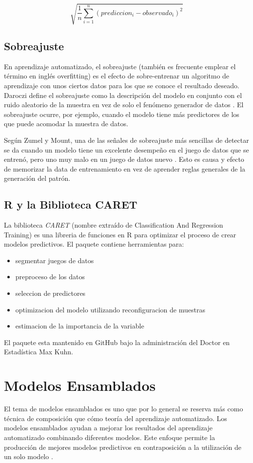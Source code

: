 \begin{spacing}{1.5}
\begin{equation}
\sqrt{\frac{1}{n}\sum_{i=1}^n(prediccion_{i} - observado_{i})^{2}}
\end{equation}

\subsection{Sobreajuste}
En aprendizaje automatizado, el sobreajuste (también es frecuente emplear el término en inglés overfitting) es el efecto de sobre-entrenar un algoritmo de aprendizaje con unos ciertos datos para los que se conoce el resultado deseado. Daroczi define el sobreajuste como la descripción del modelo en conjunto con el ruido aleatorio de la muestra en vez de solo el fenómeno generador de datos \cite{daroczi}. El sobreajuste ocurre, por ejemplo, cuando el modelo tiene más predictores de los que puede acomodar la muestra de datos.

Según Zumel y Mount, una de las señales de sobreajuste más sencillas de detectar se da cuando un modelo tiene un excelente desempeño en el juego de datos que se entrenó, pero uno muy malo en un juego de datos nuevo \cite{zumelMount}. Esto es causa y efecto de memorizar la data de entrenamiento en vez de aprender reglas generales de la generación del patrón. 

\subsection{R y la Biblioteca CARET}
La biblioteca \emph{CARET} (nombre extraído de Classification And Regression Training) es una libreria de funciones en R para optimizar el proceso de crear modelos predictivos. El paquete contiene herramientas para:

\begin{itemize}
	\item segmentar juegos de datos
	\item preproceso de los datos
	\item seleccion de predictores
	\item optimizacion del modelo utilizando reconfiguracion de muestras
	\item estimacion de la importancia de la variable
\end{itemize}

El paquete esta mantenido en GitHub bajo la administración del Doctor en Estadística Max Kuhn. 

\section{Modelos Ensamblados}
El tema de modelos ensamblados es uno que por lo general se reserva más como técnica de composición que cómo teoría del aprendizaje automatizado. Los modelos ensamblados ayudan a mejorar los resultados del aprendizaje automatizado combinando diferentes modelos. Este enfoque permite la producción de mejores modelos predictivos en contraposición a la utilización de un solo modelo \cite{smolyakov}.


\end{spacing}
